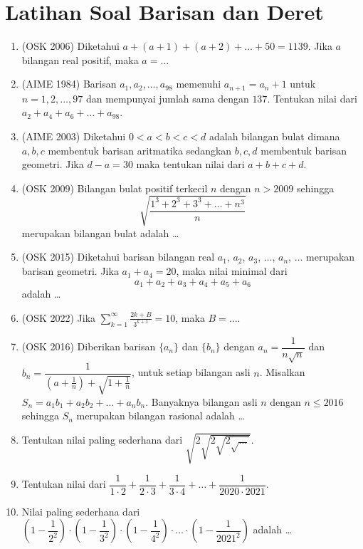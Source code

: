 \documentclass[a4paper]{article}
\begin{document}
\section{Latihan Soal Barisan dan Deret}
\begin{enumerate}
\item (OSK 2006) Diketahui $a+(a+1)+(a+2)+\dots+50=1139$. Jika $a$ bilangan real positif, maka $a=\dots$

\item (AIME 1984) Barisan $a_1,a_2,\dots,a_{98}$ memenuhi $a_{n+1}=a_n+1$ untuk $n=1,2,\dots,97$ dan mempunyai jumlah sama dengan $137$. Tentukan nilai dari $a_2+a_4+a_6+\dots+a_{98}$.

\item (AIME 2003) Diketahui $0<a<b<c<d$ adalah bilangan bulat dimana $a,b,c$ membentuk barisan aritmatika sedangkan $b,c,d$ membentuk barisan geometri. Jika $d-a=30$ maka tentukan nilai dari $a+b+c+d$.

\item (OSK 2009) Bilangan bulat positif terkecil $n$ dengan $n> 2009$ sehingga $$\sqrt{\dfrac{1^3+2^3+3^3+\dots+n^3}{n}}$$
merupakan bilangan bulat adalah \dots

\item (OSK 2015) Diketahui barisan bilangan real $a_1$, $a_2$, $a_3$, $\dots$, $a_n$, $\dots$ merupakan barisan geometri. Jika $a_1+a_4 = 20$, maka nilai minimal dari
\[a_1 + a_2 + a_3 + a_4 + a_5 + a_6\]
adalah \ldots

\item (OSK 2022) Jika $\displaystyle\sum_{k=1}^{\infty} \frac{2k + B}{3^{k+1}} = 10$, maka $B = \ldots $.

\item (OSK 2016) Diberikan barisan $\{a_n\}$ dan $\{b_n\}$ dengan $a_n = \dfrac{1}{n\sqrt{n}}$ dan $b_n = \dfrac{1}{\left(a+\frac{1}{n}\right)+\sqrt{1+\frac{1}{n}}}$, untuk setiap bilangan asli $n$. Misalkan $S_n = a_1b_1 + a_2b_2 + \ldots + a_nb_n$. Banyaknya
bilangan asli $n$ dengan $n \le 2016$ sehingga $S_n$ merupakan bilangan rasional adalah \ldots 

\item Tentukan nilai paling sederhana dari $\sqrt{2\sqrt{2\sqrt{2\sqrt{\dots}}}}$.

\item Tentukan nilai dari $\dfrac{1}{1\cdot2}+\dfrac{1}{2\cdot 3}+\dfrac{1}{3 \cdot 4}+\dots+\dfrac{1}{2020 \cdot 2021}.$

\item  Nilai paling sederhana dari $\left(1-\dfrac{1}{2^2}\right)\cdot\left(1-\dfrac{1}{3^2}\right)\cdot\left(1-\dfrac{1}{4^2}\right)\cdot\dots\cdot\left(1-\dfrac{1}{2021^2}\right)$ adalah \dots


\end{enumerate}
\end{document}
